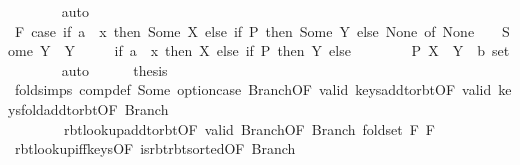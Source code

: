 \begin{isabellebody}
\ \ \ \ \ \ \isamarkupfalse%
\ auto\isanewline
\ \ \ \ \isamarkupfalse%
\ F{}{\isacharcolon}{\kern0pt}\ {\isachardoublequoteopen}{\isacharparenleft}{\kern0pt}case\ if\ a\ {\isacharequal}{\kern0pt}\ x\ then\ Some\ X\ else\ if\ P\ then\ Some\ Y\ else\ None\ of\ None\ {\isasymRightarrow}\ {\isacharbraceleft}{\kern0pt}{\isacharbraceright}{\kern0pt}\ {\isacharbar}{\kern0pt}\ Some\ Y\ {\isasymRightarrow}\ Y{\isacharparenright}{\kern0pt}\ {\isacharequal}{\kern0pt}\isanewline
\ \ \ \ {\isacharparenleft}{\kern0pt}if\ a\ {\isacharequal}{\kern0pt}\ x\ then\ X\ else\ if\ P\ then\ Y\ else\ {\isacharbraceleft}{\kern0pt}{\isacharbraceright}{\kern0pt}{\isacharparenright}{\kern0pt}{\isachardoublequoteclose}\isanewline
\ \ \ \ \ \ \ P\ X\ \ Y\ {\isacharcolon}{\kern0pt}{\isacharcolon}{\kern0pt}\ {\isachardoublequoteopen}{\isacharprime}{\kern0pt}b\ set{\isachardoublequoteclose}\isanewline
\ \ \ \ \ \ \isamarkupfalse%
\ auto\isanewline
\ \ \ \ \isamarkupfalse%
\ {\isacharquery}{\kern0pt}thesis\isanewline
\ \ \ \ \ \ \isamarkupfalse%
\ fold{\isacharunderscore}{\kern0pt}simps\ comp{\isacharunderscore}{\kern0pt}def\ Some\ option{\isachardot}{\kern0pt}case{\isacharparenleft}{\kern0pt}{}{\isacharparenright}{\kern0pt}\ Branch{\isacharparenleft}{\kern0pt}{}{\isacharparenright}{\kern0pt}{\isacharbrackleft}{\kern0pt}OF\ valid{\isacharprime}{\kern0pt}{\isacharbrackright}{\kern0pt}\ keys{\isacharunderscore}{\kern0pt}add{\isacharunderscore}{\kern0pt}to{\isacharunderscore}{\kern0pt}rbt{\isacharbrackleft}{\kern0pt}OF\ valid{\isacharbrackright}{\kern0pt}\ keys{\isacharunderscore}{\kern0pt}fold{\isacharunderscore}{\kern0pt}add{\isacharunderscore}{\kern0pt}to{\isacharunderscore}{\kern0pt}rbt{\isacharbrackleft}{\kern0pt}OF\ Branch{\isacharparenleft}{\kern0pt}{}{\isacharparenright}{\kern0pt}{\isacharbrackright}{\kern0pt}\isanewline
\ \ \ \ \ \ \ \ rbt{\isacharunderscore}{\kern0pt}lookup{\isacharunderscore}{\kern0pt}add{\isacharunderscore}{\kern0pt}to{\isacharunderscore}{\kern0pt}rbt{\isacharbrackleft}{\kern0pt}OF\ valid{\isacharbrackright}{\kern0pt}\ Branch{\isacharparenleft}{\kern0pt}{}{\isacharparenright}{\kern0pt}{\isacharbrackleft}{\kern0pt}OF\ Branch{\isacharparenleft}{\kern0pt}{}{\isacharparenright}{\kern0pt}{\isacharbrackright}{\kern0pt}\ fold{\isacharunderscore}{\kern0pt}set\ F{}\ F{}\isanewline
\ \ \ \ \ \ \isamarkupfalse%
\ rbt{\isacharunderscore}{\kern0pt}lookup{\isacharunderscore}{\kern0pt}iff{\isacharunderscore}{\kern0pt}keys{\isacharparenleft}{\kern0pt}{}{\isacharcomma}{\kern0pt}{}{\isacharparenright}{\kern0pt}{\isacharbrackleft}{\kern0pt}OF\ is{\isacharunderscore}{\kern0pt}rbt{\isacharunderscore}{\kern0pt}rbt{\isacharunderscore}{\kern0pt}sorted{\isacharbrackleft}{\kern0pt}OF\ Branch{\isacharparenleft}{\kern0pt}{}{\isacharparenright}{\kern0pt}{\isacharbrackright}{\kern0pt}{\isacharbrackright}{\kern0pt}\isanewline

\end{isabellebody}
